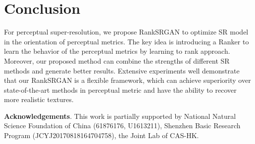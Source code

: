 \documentclass[10pt,twocolumn,letterpaper]{article}
\begin{document}
\section{Conclusion}
For perceptual super-resolution, we propose RankSRGAN to optimize SR model in the orientation of perceptual metrics. The key idea is introducing a Ranker to learn the behavior  of the perceptual metrics by learning to rank approach. Moreover, our proposed method can combine the strengths of different SR methods and generate better results. Extensive experiments well demonstrate that our RankSRGAN is a flexible framework, which can achieve superiority over state-of-the-art methods in perceptual metric and have the ability to recover more realistic textures. 

\textbf{Acknowledgements}. This work is partially supported by National Natural Science Foundation of China (61876176,  U1613211), Shenzhen Basic Research Program (JCYJ20170818164704758), the Joint Lab of CAS-HK.



{\small


}
\newpage










\end{document}
